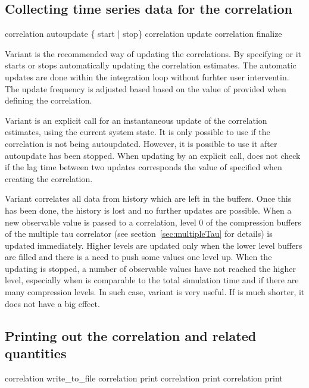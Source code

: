 \subsection{Collecting time series data for the correlation}

\begin{essyntax}
 correlation  autoupdate \{ start | stop\} 
 correlation  update 
 correlation  finalize
\end{essyntax}

Variant  is the recommended way of updating the correlations.
By specifying  or  it starts or stops automatically
updating the correlation estimates. The automatic updates are done
within the integration loop without furhter user interventin.
The update frequency is adjusted based based on the value of  
provided when defining the correlation.  

Variant  is an explicit call for an instantaneous 
update of the correlation estimates, using the current system
state. It is only possible to use  if the correlation
is not being autoupdated. However, it is possible to use it
after autoupdate has been stopped. When updating by an explicit
call, \es does not check if the lag time between two updates
corresponds the value of  specified when creating the 
correlation.

Variant  correlates all data from history which are left in
the buffers. Once this has been done, the history is lost and no
further updates are possible. 
When a new observable value is passed to a correlation,
level 0 of the compression buffers of the multiple tau
correlator (see section~\ref{sec:multipleTau} for details) 
is updated immediately. Higher levels are
updated only when the lower level buffers are filled and
there is a need to push some values one level up. When the
updating is stopped, a number of observable values have not
reached the higher level, especially when  
is comparable to the total simulation time
and if there are many compression levels. In such case,
variant  is very useful. If  
is much shorter, it does not have a big effect.


\subsection{Printing out the correlation and related quantities}
\label{ssec:CorrError}
\begin{essyntax}
 correlation  write_to_file 
 correlation  print 
 correlation  print  
 correlation  print 
\end{essyntax}

